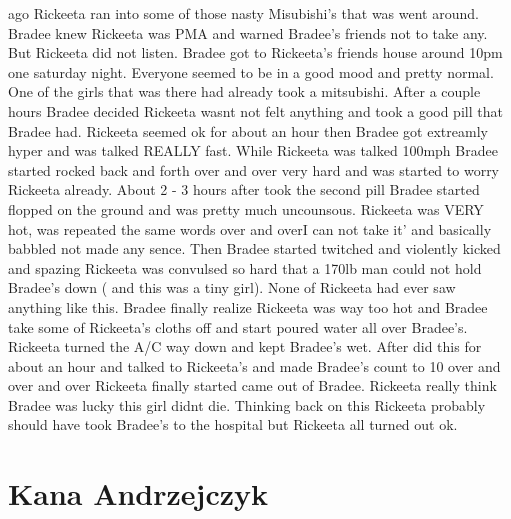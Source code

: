 \documentclass[12pt]{book}
\begin{document}
ago Rickeeta ran into some of those nasty Misubishi's that was went around. Bradee knew Rickeeta was PMA and warned Bradee's friends not to take any. But Rickeeta did not listen. Bradee got to Rickeeta's friends house around 10pm one saturday night. Everyone seemed to be in a good mood and pretty normal. One of the girls that was there had already took a mitsubishi. After a couple hours Bradee decided Rickeeta wasnt not felt anything and took a good pill that Bradee had. Rickeeta seemed ok for about an hour then Bradee got extreamly hyper and was talked REALLY fast. While Rickeeta was talked 100mph Bradee started rocked back and forth over and over very hard and was started to worry Rickeeta already. About 2 - 3 hours after took the second pill Bradee started flopped on the ground and was pretty much uncounsous. Rickeeta was VERY hot, was repeated the same words over and overI can not take it' and basically babbled not made any sence. Then Bradee started twitched and violently kicked and spazing Rickeeta was convulsed so hard that a 170lb man could not hold Bradee's down ( and this was a tiny girl). None of Rickeeta had ever saw anything like this. Bradee finally realize Rickeeta was way too hot and Bradee take some of Rickeeta's cloths off and start poured water all over Bradee's. Rickeeta turned the A/C way down and kept Bradee's wet. After did this for about an hour and talked to Rickeeta's and made Bradee's count to 10 over and over and over Rickeeta finally started came out of Bradee. Rickeeta really think Bradee was lucky this girl didnt die. Thinking back on this Rickeeta probably should have took Bradee's to the hospital but Rickeeta all turned out ok.



\chapter{Kana Andrzejczyk}
\end{document}
